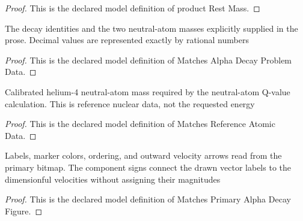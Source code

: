 \begin{proof}
  This is the declared model definition of product Rest Mass.
\end{proof}
\begin{definition}
  \label{def:physics:phyx-mini-0618:phyxminiproblems-problemphyxmini0618-matchesalphadecayproblemdata}
  The decay identities and the two neutral-atom masses explicitly supplied in the prose. Decimal values are represented exactly by rational numbers
\end{definition}
\begin{proof}
  This is the declared model definition of Matches Alpha Decay Problem Data.
\end{proof}
\begin{definition}
  \label{def:physics:phyx-mini-0618:phyxminiproblems-problemphyxmini0618-matchesreferenceatomicdata}
  Calibrated helium-4 neutral-atom mass required by the neutral-atom Q-value calculation. This is reference nuclear data, not the requested energy
\end{definition}
\begin{proof}
  This is the declared model definition of Matches Reference Atomic Data.
\end{proof}
\begin{definition}
  \label{def:physics:phyx-mini-0618:phyxminiproblems-problemphyxmini0618-matchesprimaryalphadecayfigure}
  Labels, marker colors, ordering, and outward velocity arrows read from the primary bitmap. The component signs connect the drawn vector labels to the dimensionful velocities without assigning their magnitudes
\end{definition}
\begin{proof}
  This is the declared model definition of Matches Primary Alpha Decay Figure.
\end{proof}
